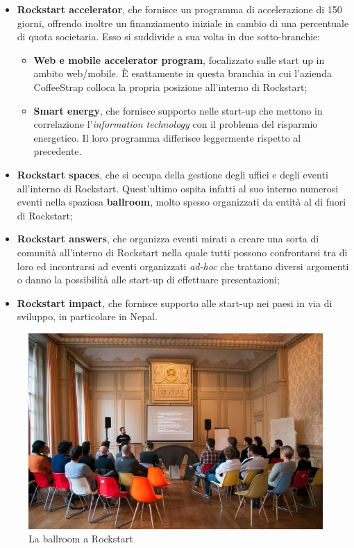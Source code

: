 \begin{itemize}

\item \textbf{Rockstart accelerator}, che fornisce un programma di accelerazione di 150 giorni, offrendo inoltre un finanziamento iniziale in cambio di una percentuale di quota societaria. Esso si suddivide a sua volta in due sotto-branchie:

\begin{itemize}

\item \textbf{Web e mobile accelerator program}, focalizzato sulle start up in ambito web/mobile. È esattamente in questa branchia in cui l'azienda CoffeeStrap colloca la propria posizione all'interno di Rockstart;

\item \textbf{Smart energy}, che fornisce supporto nelle start-up che mettono in correlazione l'\textit{information technology} con il problema del risparmio energetico. Il loro programma differisce leggermente rispetto al precedente.

\end{itemize}

\item \textbf{Rockstart spaces}, che si occupa della gestione degli uffici e degli eventi all'interno di Rockstart. Quest'ultimo ospita infatti al suo interno numerosi eventi nella spaziosa \textbf{ballroom}, molto spesso organizzati da entità al di fuori di Rockstart;

\item \textbf{Rockstart answers}, che organizza eventi mirati a creare una sorta di comunità all'interno di Rockstart nella quale tutti possono confrontarsi tra di loro ed incontrarsi ad eventi organizzati \textit{ad-hoc} che trattano diversi argomenti o danno la possibilità alle start-up di effettuare presentazioni;

\item \textbf{Rockstart impact}, che fornisce supporto alle start-up nei paesi in via di sviluppo, in particolare in Nepal. 

\end{itemize}

\begin{figure}[htp]
\centering
\includegraphics[width=\textwidth]{../immagini/rockstart-ballroom}
\caption{La ballroom a Rockstart}  
\end{figure}

